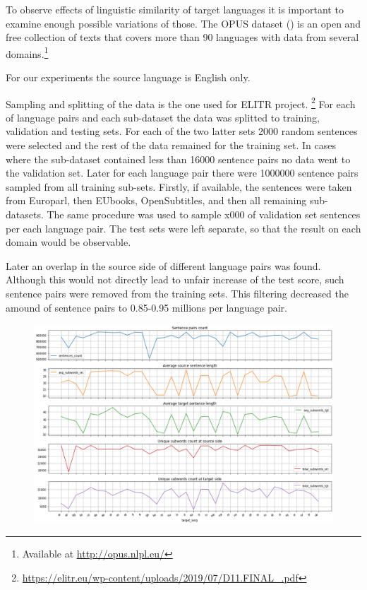 To observe effects of linguistic similarity of target languages
it is important to examine enough possible variations of those.
The OPUS dataset (\cite{TIEDEMANN12.463}) is an open and free collection of texts
that covers more than 90 languages with data from several
domains.\footnote{Available at \url{http://opus.nlpl.eu/}} 

For our experiments the source language is English only.

Sampling and splitting of the data is the one used for
ELITR project.%
\footnote{\url{https://elitr.eu/wp-content/uploads/2019/07/D11.FINAL\_.pdf}}
For each of language pairs and each sub-dataset
the data was splitted to training, validation and testing sets.
For each of the two latter sets 2000 random sentences were selected
and the rest of the data remained for the training set.
In cases where the sub-dataset contained less than 16000 sentence pairs
no data went to the validation set.
Later for each language pair there were 1000000 sentence pairs
sampled from all training sub-sets.
Firstly, if available, the sentences were taken from Europarl,
then EUbooks, OpenSubtitles, and then all remaining sub-datasets.
The same procedure was used to sample x000 of validation set sentences
per each language pair.
The test sets were left separate, so that the result on each domain would be observable.

Later an overlap in the source side of different language pairs was found.
Although this would not directly lead to unfair increase of the test score,
such sentence pairs were removed from the training sets.
This filtering decreased the amound of sentence pairs
to 0.85-0.95 millions per language pair.

\begin{figure}[h]
	\centering
	\includegraphics[width=0.9\columnwidth]{../img/train_set_statistics.png}
	\label{fig:language_statistics}
\end{figure}


